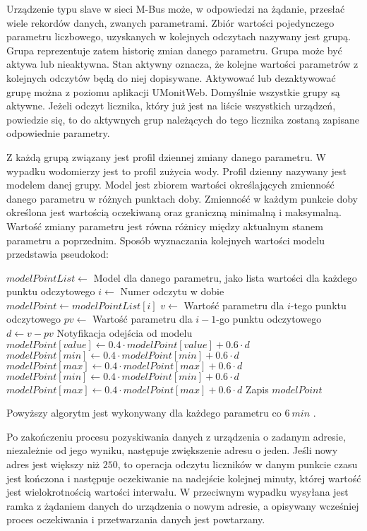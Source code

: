 Urządzenie typu slave w sieci M-Bus może, w odpowiedzi na żądanie, przesłać wiele rekordów danych, zwanych parametrami.
Zbiór wartości pojedynczego parametru liczbowego, uzyskanych w kolejnych odczytach nazywany jest grupą.
Grupa reprezentuje zatem historię zmian danego parametru.
Grupa może być aktywa lub nieaktywna.
Stan aktywny oznacza, że kolejne wartości parametrów z kolejnych odczytów będą do niej dopisywane.
Aktywować lub dezaktywować grupę można z poziomu aplikacji UMonitWeb.
Domyślnie wszystkie grupy są aktywne.
Jeżeli odczyt licznika, który już jest na liście wszystkich urządzeń, powiedzie się, to do aktywnych grup należących do tego licznika zostaną zapisane odpowiednie parametry.

Z każdą grupą związany jest profil dziennej zmiany danego parametru.
W wypadku wodomierzy jest to profil zużycia wody.
Profil dzienny nazywany jest modelem danej grupy.
Model jest zbiorem wartości określających zmienność danego parametru w różnych punktach doby.
Zmienność w każdym punkcie doby określona jest wartością oczekiwaną oraz graniczną minimalną i maksymalną.
Wartość zmiany parametru jest równa różnicy między aktualnym stanem parametru a poprzednim.
Sposób wyznaczania kolejnych wartości modelu przedstawia pseudokod:

\begin{algorithmic}
	\State $modelPointList \gets$ Model dla danego parametru, jako lista wartości dla każdego punktu odczytowego
	\State $i \gets$ Numer odczytu w dobie
	\State $modelPoint \gets modelPointList[i]$
	\State $v \gets $ Wartość parametru dla $i$-tego punktu odczytowego
	\State $pv \gets $ Wartość parametru dla $i-1$-go punktu odczytowego
	\State $d \gets v - pv$
		\State Notyfikacja odejścia od modelu
	\EndIf
	\State $modelPoint[value] \gets 0.4 \cdot modelPoint[value] + 0.6 \cdot d$
	    \State $modelPoint[min] \gets 0.4 \cdot modelPoint[min] + 0.6 \cdot d$
		\State $modelPoint[max] \gets 0.4 \cdot modelPoint[max] + 0.6 \cdot d$
	\Else
		\State $modelPoint[min] \gets 0.4 \cdot modelPoint[min] + 0.6 \cdot d$
		\State $modelPoint[max] \gets 0.4 \cdot modelPoint[max] + 0.6 \cdot d$
	\EndIf
	\State Zapis $modelPoint$
\end{algorithmic}

Powyższy algorytm jest wykonywany dla każdego parametru co $ 6\ min$ .

Po zakończeniu procesu pozyskiwania danych z urządzenia o zadanym adresie, niezależnie od jego wyniku, następuje zwiększenie adresu o jeden.
Jeśli nowy adres jest większy niż $ 250 $, to operacja odczytu liczników w danym punkcie czasu jest kończona i następuje oczekiwanie na nadejście kolejnej minuty, której wartość jest wielokrotnością wartości interwału.
W przeciwnym wypadku wysyłana jest ramka z żądaniem danych do urządzenia o nowym adresie, a opisywany wcześniej proces oczekiwania i przetwarzania danych jest powtarzany.

